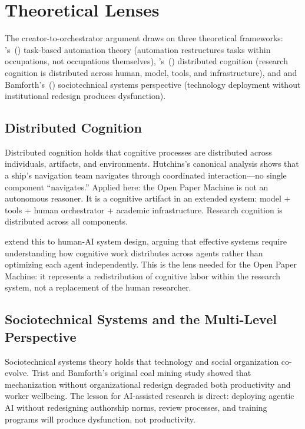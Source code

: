 \documentclass{article}
\begin{document}
\section{Theoretical Lenses}
\label{sec:lenses}

The creator-to-orchestrator argument draws on three theoretical frameworks: \citeauthor{autor2015why}'s~(\citeyear{autor2015why}) task-based automation theory (automation restructures tasks within occupations, not occupations themselves), \citeauthor{hutchins1995cognition}'s~(\citeyear{hutchins1995cognition}) distributed cognition (research cognition is distributed across human, model, tools, and infrastructure), and \citeauthor{trist1951social} and Bamforth's~(\citeyear{trist1951social}) sociotechnical systems perspective (technology deployment without institutional redesign produces dysfunction).

\subsection{Distributed Cognition}

Distributed cognition \citep{hutchins1995cognition} holds that cognitive processes are distributed across individuals, artifacts, and environments. Hutchins's canonical analysis shows that a ship's navigation team navigates through coordinated interaction---no single component ``navigates.'' Applied here: the Open Paper Machine is not an autonomous reasoner. It is a cognitive artifact in an extended system: model + tools + human orchestrator + academic infrastructure. Research cognition is distributed across all components.

\citet{naikar2023designing} extend this to human-AI system design, arguing that effective systems require understanding how cognitive work distributes across agents rather than optimizing each agent independently. This is the lens needed for the Open Paper Machine: it represents a redistribution of cognitive labor within the research system, not a replacement of the human researcher.

\subsection{Sociotechnical Systems and the Multi-Level Perspective}

Sociotechnical systems theory \citep{trist1951social} holds that technology and social organization co-evolve. Trist and Bamforth's original coal mining study showed that mechanization without organizational redesign degraded both productivity and worker wellbeing. The lesson for AI-assisted research is direct: deploying agentic AI without redesigning authorship norms, review processes, and training programs will produce dysfunction, not productivity.
\end{document}
